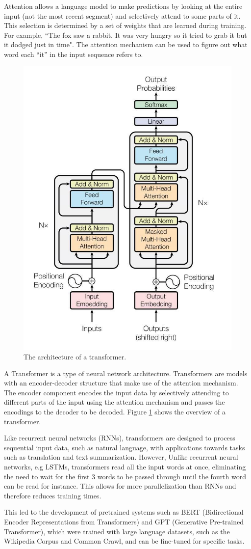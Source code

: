 \documentclass[journal,onecolumn]{IEEEtran}
\begin{document}
Attention allows a language model to make predictions by looking at the entire input (not the most recent segment) and selectively attend to some parts of it. This selection is determined by a set of weights that are learned during training. For example, ``The fox saw a rabbit. It was very hungry so it tried to grab it but it dodged just in time". The attention mechanism can be used to figure out what word each “it” in the input sequence refers to\cite{fallah_overview_2021}.
\begin{figure}[t]
	\centering
	\includegraphics[width=0.4\linewidth]{figures/transformer_architecture.jpg}
	\caption{The architecture of a transformer.\cite{noauthor_language_nodate}}
	\label{fig:architecture}
\end{figure}
A Transformer is a type of neural network architecture. Transformers are models with an encoder-decoder structure that make use of the attention mechanism. The encoder component encodes the input data by selectively attending to different parts of the input using the attention mechanism and passes the encodings to the decoder to be decoded. Figure \ref{fig:architecture} shows the overview of a transformer.

Like recurrent neural networks (RNNs), transformers are designed to process sequential input data, such as natural language, with applications towards tasks such as translation and text summarization. However, Unlike recurrent neural networks, e.g LSTMs, transformers read all the input words at once, eliminating the need to wait for the first 3 words to be passed through until the fourth word can be read for instance. This allows for more parallelization than RNNs and therefore reduces training times\cite{fallah_overview_2021}.

This led to the development of pretrained systems such as BERT (Bidirectional Encoder Representations from Transformers) and GPT (Generative Pre-trained Transformer), which were trained with large language datasets, such as the Wikipedia Corpus and Common Crawl, and can be fine-tuned for specific tasks. 
\end{document}
